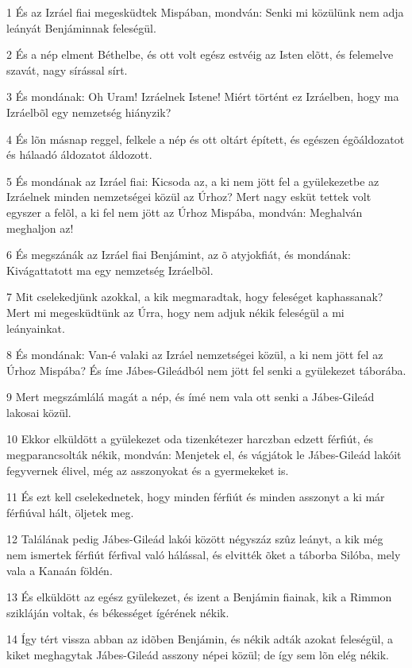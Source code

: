 \par 1 És az Izráel fiai megesküdtek Mispában, mondván: Senki mi közülünk nem adja leányát Benjáminnak feleségül.
\par 2 És a nép elment Béthelbe, és ott volt egész estvéig az Isten elõtt, és felemelve szavát, nagy sírással sírt.
\par 3 És mondának: Oh Uram! Izráelnek Istene! Miért történt ez Izráelben, hogy ma Izráelbõl egy nemzetség hiányzik?
\par 4 És lõn másnap reggel, felkele a nép és ott oltárt épített, és egészen égõáldozatot és hálaadó áldozatot áldozott.
\par 5 És mondának az Izráel fiai: Kicsoda az, a ki nem jött fel a gyülekezetbe az Izráelnek minden nemzetségei közül az Úrhoz? Mert nagy esküt tettek volt egyszer a felõl, a ki fel nem jött az Úrhoz Mispába, mondván: Meghalván meghaljon az!
\par 6 És megszánák az Izráel fiai Benjámint, az õ atyjokfiát, és mondának: Kivágattatott ma egy nemzetség Izráelbõl.
\par 7 Mit cselekedjünk azokkal, a kik megmaradtak, hogy feleséget kaphassanak? Mert mi megesküdtünk az Úrra, hogy nem adjuk nékik feleségül a mi leányainkat.
\par 8 És mondának: Van-é valaki az Izráel nemzetségei közül, a ki nem jött fel az Úrhoz Mispába? És íme Jábes-Gileádból nem jött fel senki a gyülekezet táborába.
\par 9 Mert megszámlálá magát a nép, és ímé nem vala ott senki a Jábes-Gileád lakosai közül.
\par 10 Ekkor elküldött a gyülekezet oda tizenkétezer harczban edzett férfiút, és megparancsolták nékik, mondván: Menjetek el, és vágjátok le Jábes-Gileád lakóit fegyvernek élivel, még az asszonyokat és a gyermekeket is.
\par 11 És ezt kell cselekednetek, hogy minden férfiút és minden asszonyt a ki már férfiúval hált,  öljetek meg.
\par 12 Találának pedig Jábes-Gileád lakói között négyszáz szûz leányt, a kik még nem ismertek férfiút férfival való hálással, és elvitték õket a táborba Silóba, mely vala a Kanaán földén.
\par 13 És elküldött az egész gyülekezet, és izent a Benjámin fiainak, kik a Rimmon szikláján voltak, és békességet ígérének nékik.
\par 14 Így tért vissza abban az idõben Benjámin, és nékik adták azokat feleségül, a kiket meghagytak Jábes-Gileád asszony népei közül; de így sem lõn elég nékik.
